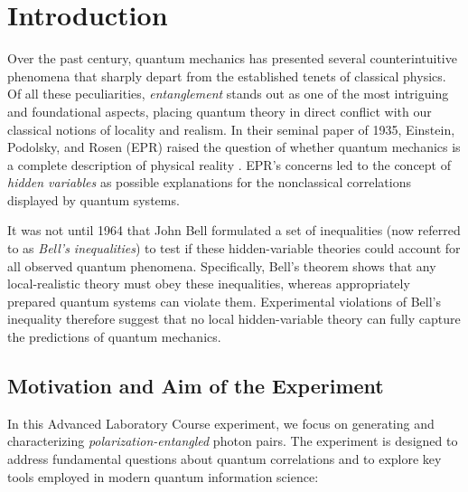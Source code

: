 \section{Introduction}
Over the past century, quantum mechanics has presented several counterintuitive phenomena that sharply depart from the established tenets of classical physics. Of all these peculiarities, \emph{entanglement} stands out as one of the most intriguing and foundational aspects, placing quantum theory in direct conflict with our classical notions of locality and realism. In their seminal paper of 1935, Einstein, Podolsky, and Rosen (EPR) raised the question of whether quantum mechanics is a complete description of physical reality \cite{EPR}. EPR’s concerns led to the concept of \emph{hidden variables} as possible explanations for the nonclassical correlations displayed by quantum systems.

It was not until 1964 that John Bell formulated a set of inequalities (now referred to as \emph{Bell’s inequalities}) to test if these hidden-variable theories could account for all observed quantum phenomena. Specifically, Bell’s theorem shows that any local-realistic theory must obey these inequalities, whereas appropriately prepared quantum systems can violate them. Experimental violations of Bell’s inequality therefore suggest that no local hidden-variable theory can fully capture the predictions of quantum mechanics.

\subsection*{Motivation and Aim of the Experiment}
In this Advanced Laboratory Course experiment, we focus on generating and characterizing \emph{polarization-entangled} photon pairs. The experiment is designed to address fundamental questions about quantum correlations and to explore key tools employed in modern quantum information science:

